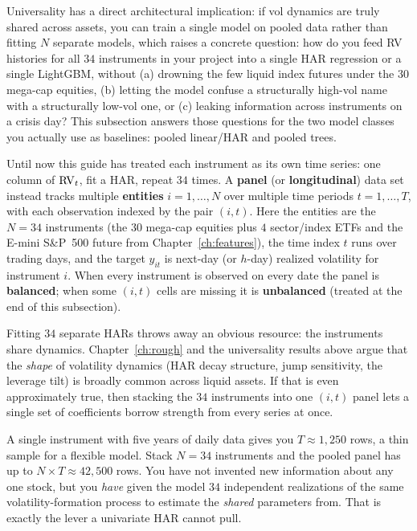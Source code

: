 Universality has a direct architectural implication: if vol dynamics are truly shared
across assets, you can train a single model on pooled data rather than fitting $N$
separate models, which raises a concrete question:
how do you feed RV histories for all $34$ instruments in your project into a single
HAR regression or a single LightGBM, without (a) drowning the few liquid index
futures under the $30$ mega-cap equities, (b) letting the model confuse a
structurally high-vol name with a structurally low-vol one, or (c) leaking
information across instruments on a crisis day?  This subsection answers those
questions for the two model classes you actually use as baselines: pooled
linear/HAR and pooled trees.

\begin{prereq}
Until now this guide has treated each instrument as its own time series: one
column of $\operatorname{RV}_t$, fit a HAR, repeat $34$ times.  A \textbf{panel} (or
\textbf{longitudinal}) data set instead tracks multiple \textbf{entities}
$i = 1, \ldots, N$ over multiple time periods $t = 1, \ldots, T$, with each
observation indexed by the pair $(i,t)$.  Here the entities are the $N = 34$
instruments (the $30$ mega-cap equities plus $4$ sector/index ETFs and the
E-mini S\&P~500 future from Chapter~\ref{ch:features}), the time index $t$ runs
over trading days, and the
target $y_{it}$ is next-day (or $h$-day) realized volatility for instrument $i$.
When every instrument is observed on every date the panel is \textbf{balanced};
when some $(i,t)$ cells are missing it is \textbf{unbalanced} (treated at the end
of this subsection).
\end{prereq}

Fitting $34$ separate HARs throws away an obvious resource: the instruments share
dynamics.  Chapter~\ref{ch:rough} and the universality results above
\citep{SirignanoCont2019,RosenbaumZhang2022} argue that the \emph{shape} of
volatility dynamics (HAR decay structure, jump sensitivity, the leverage tilt)
is broadly common across liquid assets.  If that is even approximately true,
then stacking the $34$ instruments into one $(i,t)$ panel lets a single set of
coefficients borrow strength from every series at once.

\begin{intuition}
A single instrument with five years of daily data gives you $T \approx 1{,}250$
rows, a thin sample for a flexible model.  Stack $N = 34$ instruments and the
pooled panel has up to $N \times T \approx 42{,}500$ rows.  You have not invented
new information about any one stock, but you \emph{have} given the model $34$
independent realizations of the same volatility-formation process to estimate the
\emph{shared} parameters from.  That is exactly the lever a univariate HAR cannot
pull.
\end{intuition}

